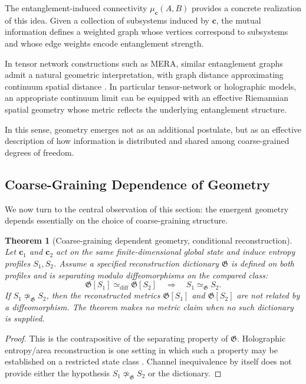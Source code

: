 \documentclass[12pt,a4paper]{article}
\newtheorem{theorem}{Theorem}[section]
\begin{document}
The entanglement-induced connectivity $\mu_{\mathbf{c}}(A,B)$ provides a concrete realization of this idea.
Given a collection of subsystems induced by $\mathbf{c}$, the mutual information defines a weighted graph whose vertices correspond to subsystems and whose edge weights encode entanglement strength.

In tensor network constructions such as MERA, similar entanglement graphs admit a natural geometric interpretation, with graph distance approximating continuum spatial distance \cite{Swingle2012}.
In particular tensor-network or holographic models, an appropriate continuum limit can be equipped with an effective Riemannian spatial geometry whose metric reflects the underlying entanglement structure.

In this sense, geometry emerges not as an additional postulate, but as an effective description of how information is distributed and shared among coarse-grained degrees of freedom.

\subsection{Coarse-Graining Dependence of Geometry}

We now turn to the central observation of this section: the emergent geometry depends essentially on the choice of coarse-graining structure.

\begin{theorem}[Coarse-graining dependent geometry, conditional reconstruction]
\label{thm:geom}
Let $\mathbf{c}_1$ and $\mathbf{c}_2$ act on the same finite-dimensional global state and induce entropy profiles $S_1,S_2$.  Assume a specified reconstruction dictionary $\mathfrak G$ is defined on both profiles and is separating modulo diffeomorphisms on the compared class:
\[
\mathfrak G[S_1]\simeq_{\mathrm{diff}}\mathfrak G[S_2]
\quad\Longrightarrow\quad
S_1\simeq_{\mathfrak G}S_2.
\]
If $S_1\not\simeq_{\mathfrak G}S_2$, then the reconstructed metrics $\mathfrak G[S_1]$ and $\mathfrak G[S_2]$ are not related by a diffeomorphism.  The theorem makes no metric claim when no such dictionary is supplied.
\end{theorem}

\begin{proof}
This is the contrapositive of the separating property of $\mathfrak G$.  Holographic entropy/area reconstruction is one setting in which such a property may be established on a restricted state class \cite{RyuTakayanagi2006}.  Channel inequivalence by itself does not provide either the hypothesis $S_1\not\simeq_{\mathfrak G}S_2$ or the dictionary.
\end{proof}
\end{document}
